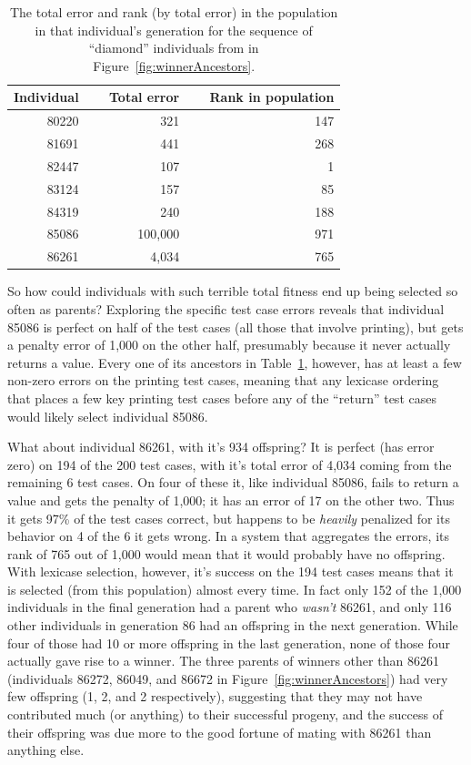 \begin{table}[t]
	\caption{The total error and rank (by total error) in the population in that individual's generation
		for the sequence of ``diamond'' individuals from in Figure~\ref{fig:winnerAncestors}.}
	\label{table:winnerFitnesses}
	\begin{center}
	\begin{tabular}{rrr}
		Individual & $\quad$ Total error & $\quad$ Rank in population \\
		\hline
		80220 & 321 & 147 \\
		81691 & 441 & 268 \\
		82447 & 107 & 1 \\
		83124 & 157 & 85 \\
		84319 & 240 & 188 \\
		85086 & 100,000 & 971 \\
		86261 & 4,034 & 765
	\end{tabular}
	\end{center}
\end{table}

So how could individuals with such terrible total fitness end up being selected so often as parents?
Exploring the specific test case errors reveals that individual 85086 is perfect on half of the test
cases (all those that involve printing), but gets a penalty error of 1,000 on the other half, presumably
because it never actually returns a value. Every one of its ancestors in 
Table~\ref{table:winnerFitnesses}, however, has at least a few non-zero errors on the printing
test cases, meaning that any lexicase ordering that places a few key printing test cases before
any of the ``return'' test cases would likely select individual 85086.

What about individual 86261, with it's 934 offspring? It is perfect (has error zero) on 194 of the 200
test cases, with it's total error of 4,034 coming from the remaining 6 test cases. On four of these it,
like individual 85086, fails to return a value and gets the penalty of 1,000; it has an error of 17 on
the other two. Thus it gets 97\% of the test cases correct, but happens to be \emph{heavily} penalized
for its behavior on 4 of the 6 it gets wrong. In a system that aggregates the errors, its rank of 765
out of 1,000 would mean that it would probably have no offspring. With lexicase selection, however,
it's success on the 194 test cases means that it is selected (from this population) almost every time.
In fact only 152 of the 1,000 individuals in the final generation had a parent who \emph{wasn't}
86261, and only 116 other individuals in generation 86 had an offspring in the next generation. While
four of those had 10 or more offspring in the last generation, none of those four actually
gave rise to a winner. The three parents of winners other than 86261 (individuals 86272, 86049, 
and 86672 in Figure~\ref{fig:winnerAncestors}) had very few offspring (1, 2, and 2 respectively),
suggesting that they may not have contributed much (or anything) to their successful progeny, and 
the success of their offspring was due more to the good fortune of mating with 86261 than anything else.

